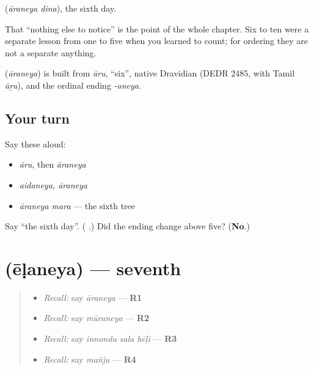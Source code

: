 \textbf{ } (\emph{āraneya dina}), the sixth day.

That \textquotedblleft{}nothing else to notice\textquotedblright{} is the point of the whole chapter. Six to ten were a separate lesson from one to five when you learned to count; for ordering they are not a separate anything.

\begin{cousinweb}
\textbf{} (\emph{āraneya}) is built from \emph{āru}, \textquotedblleft{}six\textquotedblright{}, native Dravidian (DEDR 2485, with Tamil \emph{āṟu}), and the ordinal ending \emph{-aneya}.
\end{cousinweb}

\subsection*{Your turn}
Say these aloud:

\begin{itemize}
\raggedright
  \item \emph{āru}, then \emph{āraneya}
  \item \emph{aidaneya, āraneya}
  \item \emph{āraneya mara} — the sixth tree
\end{itemize}

\begin{tcolorbox}[breakable,colback=teal!4,colframe=teal!35!black,title={Before you move on}]
Say \textquotedblleft{}the sixth day\textquotedblright{}. (\textbf{ }.) Did the ending change above five? (\textbf{No}.)
\end{tcolorbox}
\section[\texorpdfstring{\kn{ಏಳನೆಯ} (ēḷaneya)}{ಏಳನೆಯ (ēḷaneya)}]{ (ēḷaneya) — seventh}

\label{lesson:KA-C75-seventh}



\begin{quote}
\begin{itemize}
\raggedright
  \item \emph{Recall:} say \emph{āraneya} — \textbf{R1}
  \item \emph{Recall:} say \emph{mūraneya} — \textbf{R2}
  \item \emph{Recall:} say \emph{innondu sala hēḷi} — \textbf{R3}
  \item \emph{Recall:} say \emph{mañju} — \textbf{R4}
\end{itemize}
\end{quote}

